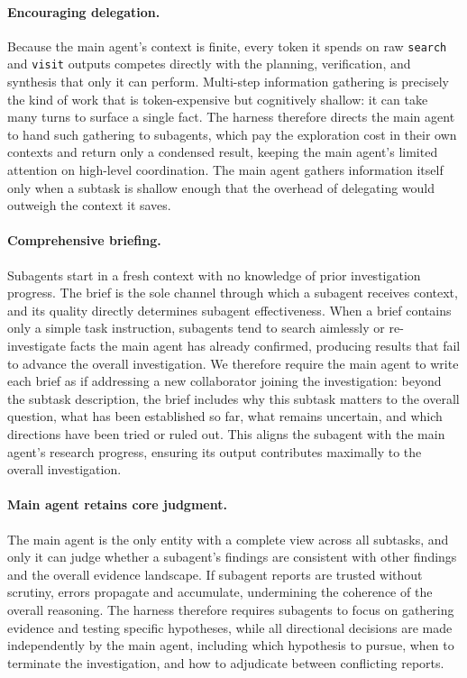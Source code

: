 \documentclass{llmxive}
\begin{document}
\paragraph{Encouraging delegation.}
Because the main agent's context is finite, every token it spends on raw \texttt{search} and \texttt{visit} outputs competes directly with the planning, verification, and synthesis that only it can perform. Multi-step information gathering is precisely the kind of work that is token-expensive but cognitively shallow: it can take many turns to surface a single fact. The harness therefore directs the main agent to hand such gathering to subagents, which pay the exploration cost in their own contexts and return only a condensed result, keeping the main agent's limited attention on high-level coordination. The main agent gathers information itself only when a subtask is shallow enough that the overhead of delegating would outweigh the context it saves.

\paragraph{Comprehensive briefing.}
Subagents start in a fresh context with no knowledge of prior investigation progress. The brief is the sole channel through which a subagent receives context, and its quality directly determines subagent effectiveness. When a brief contains only a simple task instruction, subagents tend to search aimlessly or re-investigate facts the main agent has already confirmed, producing results that fail to advance the overall investigation. We therefore require the main agent to write each brief as if addressing a new collaborator joining the investigation: beyond the subtask description, the brief includes why this subtask matters to the overall question, what has been established so far, what remains uncertain, and which directions have been tried or ruled out. This aligns the subagent with the main agent's research progress, ensuring its output contributes maximally to the overall investigation.

\paragraph{Main agent retains core judgment.}
The main agent is the only entity with a complete view across all subtasks, and only it can judge whether a subagent's findings are consistent with other findings and the overall evidence landscape. If subagent reports are trusted without scrutiny, errors propagate and accumulate, undermining the coherence of the overall reasoning. The harness therefore requires subagents to focus on gathering evidence and testing specific hypotheses, while all directional decisions are made independently by the main agent, including which hypothesis to pursue, when to terminate the investigation, and how to adjudicate between conflicting reports.
\end{document}
